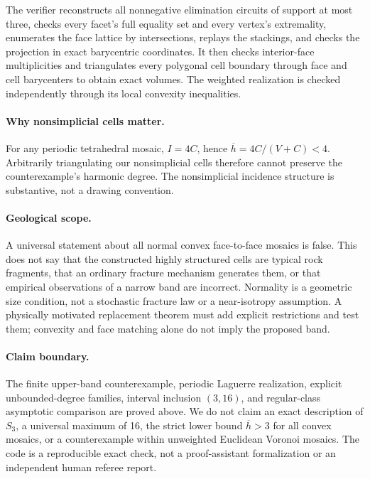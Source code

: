 \documentclass[11pt,a4paper]{article}
\theoremstyle{definition}\newtheorem{definition}[theorem]{Definition}
\theoremstyle{remark}\newtheorem{remark}[theorem]{Remark}
\newcommand{\hbarM}{\overline h}\newcommand{\nbar}{\overline n}\newcommand{\vbar}{\overline v}
\begin{document}
The verifier reconstructs all nonnegative elimination circuits of support at most three, checks every facet's full equality set and every vertex's extremality, enumerates the face lattice by intersections, replays the stackings, and checks the projection in exact barycentric coordinates. It then checks interior-face multiplicities and triangulates every polygonal cell boundary through face and cell barycenters to obtain exact volumes. The weighted realization is checked independently through its local convexity inequalities.

\paragraph{Why nonsimplicial cells matter.}
For any periodic tetrahedral mosaic, $I=4C$, hence $\hbarM=4C/(V+C)<4$. Arbitrarily triangulating our nonsimplicial cells therefore cannot preserve the counterexample's harmonic degree. The nonsimplicial incidence structure is substantive, not a drawing convention.

\paragraph{Geological scope.}
A universal statement about all normal convex face-to-face mosaics is false. This does not say that the constructed highly structured cells are typical rock fragments, that an ordinary fracture mechanism generates them, or that empirical observations of a narrow band are incorrect. Normality is a geometric size condition, not a stochastic fracture law or a near-isotropy assumption. A physically motivated replacement theorem must add explicit restrictions and test them; convexity and face matching alone do not imply the proposed band.

\paragraph{Claim boundary.}
The finite upper-band counterexample, periodic Laguerre realization, explicit unbounded-degree families, interval inclusion \((3,16)\), and regular-class asymptotic comparison are proved above. We do not claim an exact description of \(S_3\), a universal maximum of 16, the strict lower bound \(\hbarM>3\) for all convex mosaics, or a counterexample within unweighted Euclidean Voronoi mosaics. The code is a reproducible exact check, not a proof-assistant formalization or an independent human referee report.

\appendix
\end{document}
